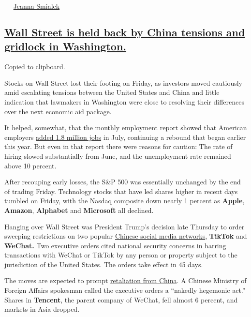 --- \href{https://www.nytimes.com/by/jeanna-smialek}{Jeanna Smialek}

\hypertarget{wall-street-is-held-back-by-china-tensions-and-gridlock-in-washington}{%
\subsection{\texorpdfstring{\protect\hyperlink{wall-street-is-held-back-by-china-tensions-and-gridlock-in-washington}{Wall
Street is held back by China tensions and gridlock in
Washington.}}{Wall Street is held back by China tensions and gridlock in Washington.}}\label{wall-street-is-held-back-by-china-tensions-and-gridlock-in-washington}}

Copied to clipboard.

Stocks on Wall Street lost their footing on Friday, as investors moved
cautiously amid escalating tensions between the United States and China
and little indication that lawmakers in Washington were close to
resolving their differences over the next economic aid package.

It helped, somewhat, that the monthly employment report showed that
American employers
\href{https://www.nytimes.com/live/2020/08/07/business/stock-market-today-coronavirus/us-employers-added-1-8-million-jobs-in-july-despite-a-coronavirus-surge}{added
1.8 million jobs} in July, continuing a rebound that began earlier this
year. But even in that report there were reasons for caution: The rate
of hiring slowed substantially from June, and the unemployment rate
remained above 10 percent.

After recouping early losses, the S\&P 500 was essentially unchanged by
the end of trading Friday. Technology stocks that have led shares higher
in recent days tumbled on Friday, with the Nasdaq composite down nearly
1 percent as \textbf{Apple}, \textbf{Amazon}, \textbf{Alphabet} and
\textbf{Microsoft} all declined.

Hanging over Wall Street was President Trump's decision late Thursday to
order sweeping restrictions on two popular
\href{https://www.nytimes.com/2020/08/06/technology/trump-wechat-tiktok-china.html}{Chinese
social media networks}, \textbf{TikTok} and \textbf{WeChat.} Two
executive orders cited national security concerns in barring
transactions with WeChat or TikTok by any person or property subject to
the jurisdiction of the United States. The orders take effect in 45
days.

The moves are expected to prompt
\href{https://www.nytimes.com/2020/08/07/business/trump-china-wechat-tiktok.html}{retaliation
from China}. A Chinese Ministry of Foreign Affairs spokesman called the
executive orders a ``nakedly hegemonic act.'' Shares in
\textbf{Tencent}, the parent company of WeChat, fell almost 6 percent,
and markets in Asia dropped.

